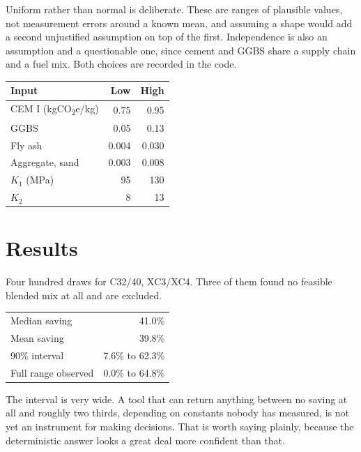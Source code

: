 \documentclass[11pt,a4paper]{article}
\begin{document}
Uniform rather than normal is deliberate. These are ranges of plausible values, not measurement
errors around a known mean, and assuming a shape would add a second unjustified assumption on
top of the first. Independence is also an assumption and a questionable one, since cement and
GGBS share a supply chain and a fuel mix. Both choices are recorded in the code.

\begin{center}
\begin{tabular}{lrr}
\toprule
\textbf{Input} & \textbf{Low} & \textbf{High} \\
\midrule
CEM I (kgCO\textsubscript{2}e/kg)   & 0.75  & 0.95 \\
GGBS                                & 0.05  & 0.13 \\
Fly ash                             & 0.004 & 0.030 \\
Aggregate, sand                     & 0.003 & 0.008 \\
$K_1$ (MPa)                         & 95    & 130 \\
$K_2$                               & 8     & 13 \\
\bottomrule
\end{tabular}
\end{center}

\section{Results}

Four hundred draws for C32/40, XC3/XC4. Three of them found no feasible blended mix at all and
are excluded.

\begin{center}
\begin{tabular}{lr}
\toprule
Median saving        & 41.0\% \\
Mean saving          & 39.8\% \\
90\% interval        & 7.6\% to 62.3\% \\
Full range observed  & 0.0\% to 64.8\% \\
\bottomrule
\end{tabular}
\end{center}

The interval is very wide. A tool that can return anything between no saving at all and roughly
two thirds, depending on constants nobody has measured, is not yet an instrument for making
decisions. That is worth saying plainly, because the deterministic answer looks a great deal
more confident than that.
\end{document}
